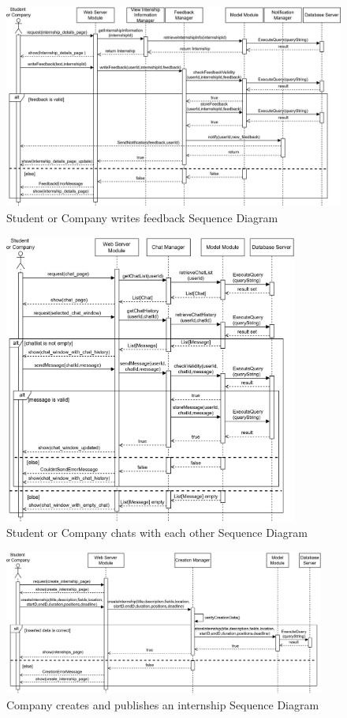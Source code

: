 \begin{figure}[H]
    \centering
    \includegraphics[width=1\textwidth]{Images/Runtime_view/feedback_SD.png}
    \caption{Student or Company writes feedback Sequence Diagram}
\end{figure}
\begin{figure}[H]
    \centering
    \includegraphics[width=0.86\textwidth]{Images/Runtime_view/chatting_SD.png}
    \caption{Student or Company chats with each other Sequence Diagram}
\end{figure}
\begin{figure}[H]
    \centering
    \includegraphics[width=0.94\textwidth]{Images/Runtime_view/createInt_SD.png}
    \caption{Company creates and publishes an internship Sequence Diagram}
\end{figure}
